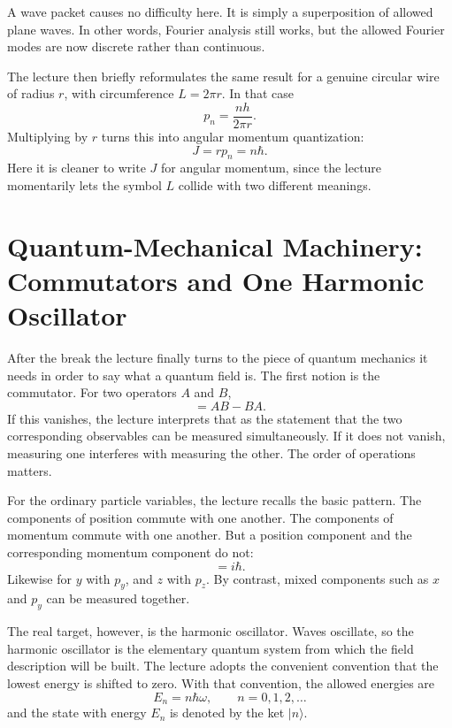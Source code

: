 A wave packet causes no difficulty here. It is simply a superposition of allowed plane waves. In other words, Fourier analysis still works, but the allowed Fourier modes are now discrete rather than continuous.

The lecture then briefly reformulates the same result for a genuine circular wire of radius \(r\), with circumference \(L=2\pi r\). In that case
\begin{equation}
p_n=\frac{nh}{2\pi r}.
\end{equation}
Multiplying by \(r\) turns this into angular momentum quantization:
\begin{equation}
J = rp_n = n\hbar.
\end{equation}
Here it is cleaner to write \(J\) for angular momentum, since the lecture momentarily lets the symbol \(L\) collide with two different meanings.

\section{Quantum-Mechanical Machinery: Commutators and One Harmonic Oscillator}

After the break the lecture finally turns to the piece of quantum mechanics it needs in order to say what a quantum field is. The first notion is the commutator. For two operators \(A\) and \(B\),
\begin{equation}
[A,B]=AB-BA.
\end{equation}
If this vanishes, the lecture interprets that as the statement that the two corresponding observables can be measured simultaneously. If it does not vanish, measuring one interferes with measuring the other. The order of operations matters.

For the ordinary particle variables, the lecture recalls the basic pattern. The components of position commute with one another. The components of momentum commute with one another. But a position component and the corresponding momentum component do not:
\begin{equation}
[x,p_x]=i\hbar.
\end{equation}
Likewise for \(y\) with \(p_y\), and \(z\) with \(p_z\). By contrast, mixed components such as \(x\) and \(p_y\) can be measured together.

The real target, however, is the harmonic oscillator. Waves oscillate, so the harmonic oscillator is the elementary quantum system from which the field description will be built. The lecture adopts the convenient convention that the lowest energy is shifted to zero. With that convention, the allowed energies are
\begin{equation}
E_n = n\hbar\omega,
\qquad
n=0,1,2,\dots
\end{equation}
and the state with energy \(E_n\) is denoted by the ket \(|n\rangle\).

